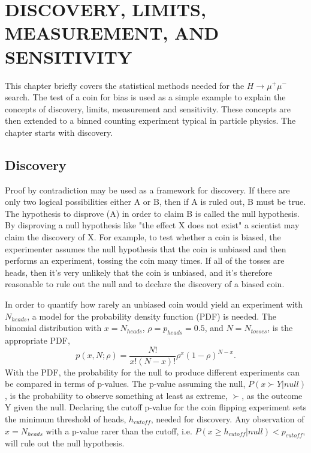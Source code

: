 \chapter{DISCOVERY, LIMITS, MEASUREMENT, AND SENSITIVITY} \label{coinflip}

This chapter briefly covers the statistical methods needed for the $H\rightarrow\mu^+\mu^-$ search. The test of a coin for bias is used as a simple example to explain the concepts of discovery, limits, measurement and sensitivity. These concepts are then extended to a binned counting experiment typical in particle physics. The chapter starts with discovery. 

\section{Discovery}
Proof by contradiction may be used as a framework for discovery. If there are only two logical possibilities either A or B, then if A is ruled out, B must be true. The hypothesis to disprove (A) in order to claim B is called the null hypothesis. By disproving a null hypothesis like "the effect X does not exist" a scientist may claim the discovery of X. For example, to test whether a coin is biased, the experimenter assumes the null hypothesis that the coin is unbiased and then performs an experiment, tossing the coin many times. If all of the tosses are heads, then it's very unlikely that the coin is unbiased, and it's therefore reasonable to rule out the null and to declare the discovery of a biased coin. 

In order to quantify how rarely an unbiased coin would yield an experiment with $N_{heads}$, a model for the probability density function (PDF) is needed. The binomial distribution with $x = N_{heads}$, $\rho = p_{heads} = 0.5$, and $N = N_{tosses}$, is the appropriate PDF,
\begin{equation}
p(x,N;\rho) = \frac{N!}{x! (N - x)!}\rho^{x}(1-\rho)^{N-x}.
\end{equation}
With the PDF, the probability for the null to produce different experiments can be compared in terms of p-values. The p-value assuming the null, $P(x \succ Y|null)$, is the probability to observe something at least as extreme, $\succ$, as the outcome Y given the null. Declaring the cutoff p-value for the coin flipping experiment sets the minimum threshold of heads, $h_{cutoff}$, needed for discovery. Any observation of $x=N_{heads}$ with a p-value rarer than the cutoff, i.e. $P(x \geq h_{cutoff}|null) < p_{cutoff}$, will rule out the null hypothesis. 

